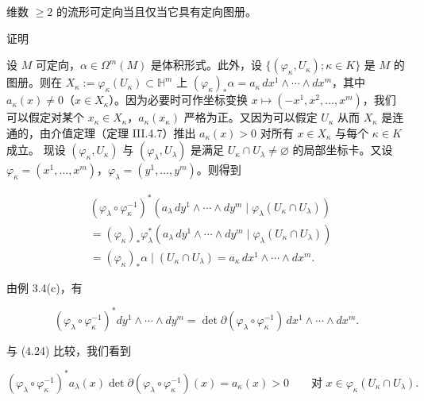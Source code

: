 \begin{proposition}

维数 $ \ge 2 $ 的流形可定向当且仅当它具有定向图册。

证明

\begin{items}
\item

设 $ M $ 可定向，$ \alpha \in \Omega^{m}(M) $ 是体积形式。此外，设 $ \{ (\varphi_{\kappa}, U_{\kappa}) ; \kappa \in K \} $ 是 $ M $ 的图册。则在 $ X_{\kappa} := \varphi_{\kappa}(U_{\kappa}) \subset \mathbb{H}^{m} $ 上 $ (\varphi_{\kappa})_{\ast}\alpha = a_{\kappa}\,dx^{1} \wedge \cdots \wedge dx^{m} $，其中 $ a_{\kappa}(x) \neq 0 $（$ x \in X_{\kappa} $）。因为必要时可作坐标变换 $ x \mapsto (-x^{1}, x^{2}, \ldots, x^{m}) $，我们可以假定对某个 $ x_{\kappa} \in X_{\kappa} $，$ a_{\kappa}(x_{\kappa}) $ 严格为正。又因为可以假定 $ U_{\kappa} $ 从而 $ X_{\kappa} $ 是连通的，由介值定理（定理 III.4.7）推出 $ a_{\kappa}(x) > 0 $ 对所有 $ x \in X_{\kappa} $ 与每个 $ \kappa \in K $ 成立。
现设 $ (\varphi_{\kappa}, U_{\kappa}) $ 与 $ (\varphi_{\lambda}, U_{\lambda}) $ 是满足 $ U_{\kappa} \cap U_{\lambda} \neq \varnothing $ 的局部坐标卡。又设 $ \varphi_{\kappa} = (x^{1}, \ldots, x^{m}) $，$ \varphi_{\lambda} = (y^{1}, \ldots, y^{m}) $。则得到

\begin{equation}
\begin{aligned}
&(\varphi_{\lambda} \circ \varphi_{\kappa}^{-1})^{*}(a_{\lambda}\,dy^{1} \wedge \cdots \wedge dy^{m} \mid \varphi_{\lambda}(U_{\kappa} \cap U_{\lambda})) \\ &= (\varphi_{\kappa})_{\ast}\varphi_{\lambda}^{*}(a_{\lambda}\,dy^{1} \wedge \cdots \wedge dy^{m} \mid \varphi_{\lambda}(U_{\kappa} \cap U_{\lambda})) \\ &= (\varphi_{\kappa})_{\ast}\alpha \mid (U_{\kappa} \cap U_{\lambda}) = a_{\kappa}\,dx^{1} \wedge \cdots \wedge dx^{m} .
\end{aligned}\tag{4.24}
\end{equation}

由例 3.4(c)，有

\[
(\varphi_{\lambda} \circ \varphi_{\kappa}^{-1})^{*}dy^{1} \wedge \cdots \wedge dy^{m} = \det \partial(\varphi_{\lambda} \circ \varphi_{\kappa}^{-1})\,dx^{1} \wedge \cdots \wedge dx^{m} .
\]

与 (4.24) 比较，我们看到

\[
(\varphi_{\lambda} \circ \varphi_{\kappa}^{-1})^{*}a_{\lambda}(x) \det \partial(\varphi_{\lambda} \circ \varphi_{\kappa}^{-1})(x) = a_{\kappa}(x) > 0 \qquad \text{对 } x \in \varphi_{\kappa}(U_{\kappa} \cap U_{\lambda}) .
\]


\end{items}
\end{proposition}
